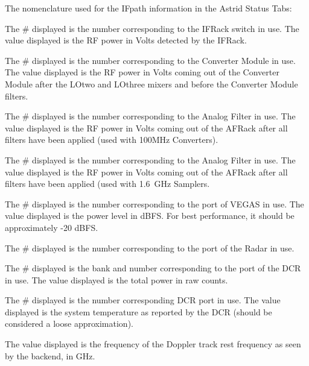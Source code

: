 \label{appendix:gbtstatus}

The nomenclature used for the \gls{IFpath} information in the \gls{Astrid} Status Tabs:
\begin{description}[leftmargin=*]
\item[{\bf IF}\#] The \# displayed is the number corresponding to the \gls{IFRack} 
switch in use. The value displayed is the \gls{RF} power in Volts detected by the 
\gls{IFRack}. 
\item[{\bf CM}\#] The \# displayed is the number corresponding to the Converter 
Module in use. The value displayed is the \gls{RF} power in Volts coming out of the 
Converter Module after the \gls{LOtwo} and \gls{LOthree} mixers and before the Converter
Module filters. 
\item[{\bf CF}\#] The \# displayed is the number corresponding to the Analog 
Filter in use. The value displayed is the \gls{RF} power in Volts coming out of the 
\gls{AFRack} after all filters have been applied (used with 100MHz Converters).
\item[{\bf SG}\#] The \# displayed is the number corresponding to the Analog 
Filter in use. The value displayed is the \gls{RF} power in Volts coming out of the 
\gls{AFRack} after all filters have been applied (used with 1.6~GHz Samplers.
\item[{\bf VEGAS-J}\#] The \# displayed is the number corresponding to the port 
of \gls{VEGAS} in use. The value displayed is the power level in dBFS. For best
performance, it should be approximately -20 dBFS.
\item[{\bf Radar-Port}\#] The \# displayed is the number corresponding to the port
of the Radar in use.
\item[{\bf DCR-Port}\#] The \# displayed is the bank and number corresponding to 
the port of the \gls{DCR} in use. The value displayed is the total power in raw
counts. 
\item[{\bf TSys}\#] The \# displayed is the number corresponding \gls{DCR} port
in use. The value displayed is the system temperature as reported by the \gls{DCR}
(should be considered a loose approximation).
\item[{\bf backendIF}] The value displayed is the frequency of the Doppler track 
rest frequency as seen by the backend, in GHz.
\end{description}

